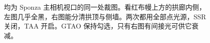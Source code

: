 \begin{figure}[H]\centering
{}\hfill
{}
\caption{均为 Sponza 主相机视口的同一处裁图。看红布幔上方的拱廊内侧，左图几乎全黑，右图能分清拱顶与侧墙。两次都用全部点光源，SSR 关闭，TAA 开启。GTAO 保持勾选，只有右图有间接光可供它衰减。}
\end{figure}
